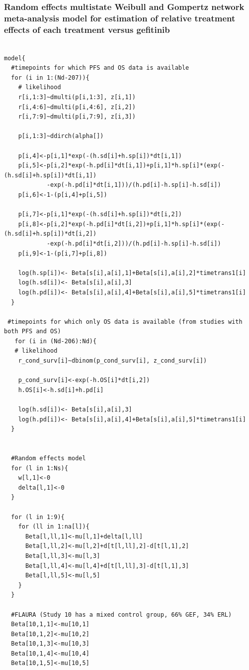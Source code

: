 \documentclass[11pt,final,fleqn]{article}\usepackage[]{graphicx}\usepackage[]{color}
\theoremstyle{plain}
\begin{document}
\begin{appendices}
\begin{verbatim}
\end{verbatim}


\subsubsection{Random effects multistate Weibull and Gompertz network meta-analysis model for estimation of relative treatment effects of each treatment versus gefitinib}
\begin{verbatim} 

model{
  #timepoints for which PFS and OS data is available
  for (i in 1:(Nd-207)){
    # likelihood
    r[i,1:3]~dmulti(p[i,1:3], z[i,1]) 
    r[i,4:6]~dmulti(p[i,4:6], z[i,2]) 
    r[i,7:9]~dmulti(p[i,7:9], z[i,3]) 
    
    p[i,1:3]~ddirch(alpha[])
    
    p[i,4]<-p[i,1]*exp(-(h.sd[i]+h.sp[i])*dt[i,1])
    p[i,5]<-p[i,2]*exp(-h.pd[i]*dt[i,1])+p[i,1]*h.sp[i]*(exp(-(h.sd[i]+h.sp[i])*dt[i,1])
    		-exp(-h.pd[i]*dt[i,1]))/(h.pd[i]-h.sp[i]-h.sd[i])
    p[i,6]<-1-(p[i,4]+p[i,5])
    
    p[i,7]<-p[i,1]*exp(-(h.sd[i]+h.sp[i])*dt[i,2])
    p[i,8]<-p[i,2]*exp(-h.pd[i]*dt[i,2])+p[i,1]*h.sp[i]*(exp(-(h.sd[i]+h.sp[i])*dt[i,2])
    		-exp(-h.pd[i]*dt[i,2]))/(h.pd[i]-h.sp[i]-h.sd[i])
    p[i,9]<-1-(p[i,7]+p[i,8])
    
    log(h.sp[i])<- Beta[s[i],a[i],1]+Beta[s[i],a[i],2]*timetrans1[i] 
    log(h.sd[i])<- Beta[s[i],a[i],3] 
    log(h.pd[i])<- Beta[s[i],a[i],4]+Beta[s[i],a[i],5]*timetrans1[i]
  }
  
 #timepoints for which only OS data is available (from studies with both PFS and OS)
   for (i in (Nd-206):Nd){
   # likelihood
    r_cond_surv[i]~dbinom(p_cond_surv[i], z_cond_surv[i]) 
    
    p_cond_surv[i]<-exp(-h.OS[i]*dt[i,2])
    h.OS[i]<-h.sd[i]+h.pd[i]
    
    log(h.sd[i])<- Beta[s[i],a[i],3] 
    log(h.pd[i])<- Beta[s[i],a[i],4]+Beta[s[i],a[i],5]*timetrans1[i]
  }
    
 
  #Random effects model
  for (l in 1:Ns){
    w[l,1]<-0
    delta[l,1]<-0
  }
  
  for (l in 1:9){
    for (ll in 1:na[l]){
      Beta[l,ll,1]<-mu[l,1]+delta[l,ll]
      Beta[l,ll,2]<-mu[l,2]+d[t[l,ll],2]-d[t[l,1],2]
      Beta[l,ll,3]<-mu[l,3]
      Beta[l,ll,4]<-mu[l,4]+d[t[l,ll],3]-d[t[l,1],3]
      Beta[l,ll,5]<-mu[l,5]
    }
  }
  
  #FLAURA (Study 10 has a mixed control group, 66% GEF, 34% ERL)
  Beta[10,1,1]<-mu[10,1]
  Beta[10,1,2]<-mu[10,2]
  Beta[10,1,3]<-mu[10,3]
  Beta[10,1,4]<-mu[10,4]
  Beta[10,1,5]<-mu[10,5]
  

\end{verbatim}
\end{appendices}
\end{document}
